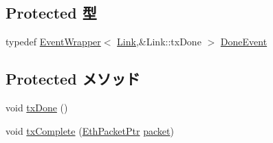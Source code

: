 \subsection*{Protected 型}
\begin{DoxyCompactItemize}
\item 
typedef \hyperlink{classEventWrapper}{EventWrapper}$<$ \hyperlink{classEtherLink_1_1Link}{Link},\&Link::txDone $>$ \hyperlink{classEtherLink_1_1Link_ad78ef1129ed0f85428598d01a78019f3}{DoneEvent}
\end{DoxyCompactItemize}
\subsection*{Protected メソッド}
\begin{DoxyCompactItemize}
\item 
void \hyperlink{classEtherLink_1_1Link_ac06188e141ad966d9d760cfcfc258587}{txDone} ()
\item 
void \hyperlink{classEtherLink_1_1Link_adbafd80b139f69d1879a399e64f4dda2}{txComplete} (\hyperlink{classRefCountingPtr}{EthPacketPtr} \hyperlink{classEtherLink_1_1Link_a8bd0d3f7eb9e8d7189c7027028a5fac0}{packet})
\end{DoxyCompactItemize}
